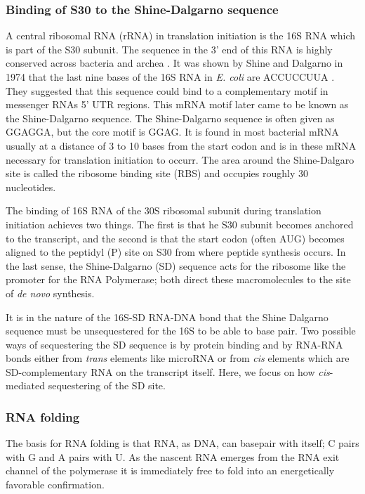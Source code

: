 \subsubsection{Binding of S30 to the Shine-Dalgarno sequence}

A central ribosomal RNA (rRNA) in translation initiation is the 16S RNA which
is part of the S30 subunit. The sequence in the 3' end of this RNA is highly
conserved across bacteria and archea \cite{nakagawa_dynamic_2010}. It was shown
by Shine and Dalgarno in 1974 that the last nine bases of the 16S RNA in 
\textit{E. coli} are ACCUCCUUA \cite{shine_3-terminal_1974}. They suggested
that this sequence could bind to a complementary motif in messenger RNAs 5' UTR
regions. This mRNA motif later came to be known as the Shine-Dalgarno sequence.
The Shine-Dalgarno sequence is often given as GGAGGA, but the core motif is
GGAG. It is found in most bacterial mRNA usually at a distance of 3 to 10
bases from the start codon \cite{chen_determination_1994-1} and is in these
mRNA necessary for translation initiation to occurr. The area around the
Shine-Dalgaro site is called the ribosome binding site (RBS) and occupies
roughly 30 nucleotides.

The binding of 16S RNA of the 30S ribosomal subunit during translation
initiation achieves two things. The first is that he S30 subunit becomes
anchored to the transcript, and the second is that the start codon (often AUG)
becomes aligned to the peptidyl (P) site on S30 from where peptide synthesis
occurs. In the last sense, the Shine-Dalgarno (SD) sequence acts for the
ribosome like the promoter for the RNA Polymerase; both direct these
macromolecules to the site of \textit{de novo} synthesis.

It is in the nature of the 16S-SD RNA-DNA bond that the Shine Dalgarno
sequence must be unsequestered for the 16S to be able to base pair. Two possible
ways of sequestering the SD sequence is by protein binding and by RNA-RNA bonds
either from \textit{trans} elements like microRNA or from \textit{cis} elements
which are SD-complementary RNA on the transcript itself. Here, we focus on how
\textit{cis}-mediated sequestering of the SD site.

\subsubsection{RNA folding}
The basis for RNA folding is that RNA, as DNA, can basepair with itself; C
pairs with G and A pairs with U. As the nascent RNA emerges from the RNA exit
channel of the polymerase it is immediately free to fold into an energetically
favorable confirmation.

